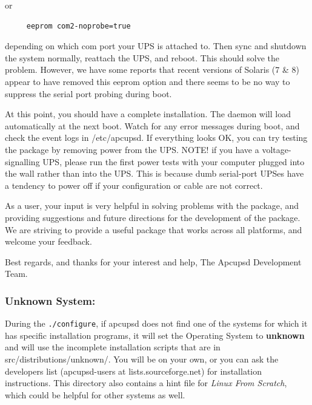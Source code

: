 or 

\footnotesize
\begin{verbatim}
     eeprom com2-noprobe=true
\end{verbatim}
\normalsize

depending on which com port your UPS is attached to. Then sync and shutdown
the system normally, reattach the UPS, and reboot. This should solve the
problem. However, we have some reports that recent versions of Solaris (7 \&
8) appear to have removed this eeprom option and there seems to be no way to
suppress the serial port probing during boot.  

At this point, you should have a complete installation. The daemon will load
automatically at the next boot. Watch for any error messages during boot, and
check the event logs in /etc/apcupsd. If everything looks OK, you can try
testing the package by removing power from the UPS. NOTE! if you have a
voltage-signalling UPS, please run the first power tests with your computer
plugged into the wall rather than into the UPS. This is because dumb
serial-port UPSes have a tendency to power off if your configuration or cable
are not correct.  

As a user, your input is very helpful in solving problems with the package,
and providing suggestions and future directions for the development of the
package. We are striving to provide a useful package that works across all
platforms, and welcome your feedback.  

Best regards, and thanks for your interest and help, The Apcupsd Development
Team. 

\label{Unknown-System}

\subsubsection*{Unknown System:}

\label{index-Unknown-System-53}
\label{index-OS_002c-Unknown-System-54}
During the {\tt ./configure}, if apcupsd does not find one of the systems for
which it has specific installation programs, it will set the Operating System
to {\bf unknown} and will use the incomplete installation scripts that are in
\lt{}src\gt{}/distributions/unknown/. You will be on your own, or you can ask
the developers list (apcupsd-users at lists.sourceforge.net) for installation
instructions. This directory also contains a hint file for {\it Linux From
Scratch}, which could be helpful for other systems as well. 

\label{Windows-Systems-with-CYGWIN-Installed}


